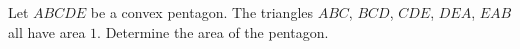 Let $ABCDE$ be a convex pentagon.
The triangles $ABC$, $BCD$, $CDE$, $DEA$, $EAB$ all have area $1$.
Determine the area of the pentagon.
